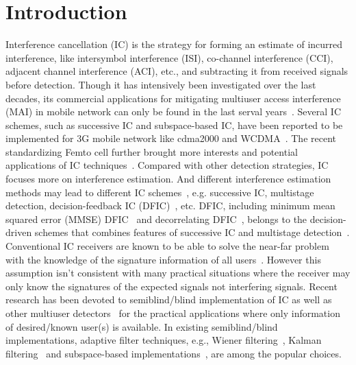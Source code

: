 \documentclass[conference]{IEEEtran}
\begin{document}
\section{Introduction}
Interference cancellation (IC) is the strategy for forming an
estimate of incurred interference, like intersymbol interference
(ISI), co-channel interference (CCI), adjacent channel
interference (ACI), etc., and subtracting it from received signals
before detection. Though it has intensively been investigated over
the last decades, its commercial applications for mitigating
multiuser access interference (MAI) in mobile network can only be
found in the last serval years~\cite{Andr05}. Several IC schemes,
such as successive IC and subspace-based IC, have been reported to
be implemented for 3G mobile network like cdma2000 and
WCDMA~\cite{Wang06A}. The recent standardizing Femto cell further
brought more interests and potential applications of IC
techniques~\cite{Air07}. Compared with other detection strategies,
IC focuses more on interference estimation. And different
interference estimation methods may lead to different IC
schemes~\cite{Verd98,Wang02b}, e.g. successive IC, multistage
detection, decision-feedback IC (DFIC)~\cite{Kave85,Duel95}, etc.
DFIC, including minimum mean squared error (MMSE)
DFIC~\cite{Kave85} and decorrelating DFIC~\cite{Duel95}, belongs
to the decision-driven schemes that combines features of
successive IC and multistage detection~\cite{Verd98}. Conventional
IC receivers are known to be able to solve the near-far problem
with the knowledge of the signature information of all
users~\cite{Verd98}. However this assumption isn't consistent with
many practical situations where the receiver may only know the
signatures of the expected signals not interfering signals. Recent
research has been devoted to semiblind/blind implementation of IC
as well as other multiuser
detectors~\cite{Madh94,Wang98,Zhang02,Wang03d,Wang05A} for the
practical applications where only information of desired/known
user(s) is available. In existing semiblind/blind implementations,
adaptive filter techniques, e.g., Wiener filtering~\cite{Madh94},
Kalman filtering~\cite{Zhang02} and subspace-based
implementations~\cite{Wang98}, are among the popular choices.
\end{document}
